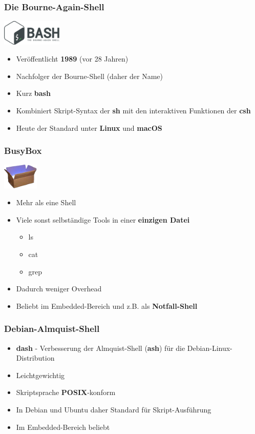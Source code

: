 \begin{frame}
    \frametitle{Die Bourne-Again-Shell}
    \includegraphics[height=1.2cm]{res/bash.png}
    \begin{itemize}
        \item Veröffentlicht \textbf{1989} (vor 28 Jahren)
        \item Nachfolger der Bourne-Shell (daher der Name)
        \item Kurz \textbf{bash}
        \item Kombiniert Skript-Syntax der \textbf{sh} mit den interaktiven Funktionen der \textbf{csh}
        \item Heute der Standard unter \textbf{Linux} und \textbf{macOS}
    \end{itemize}
\end{frame}

\begin{frame}
    \frametitle{BusyBox}
    \includegraphics[height=1.2cm]{res/busybox.png}
    \begin{itemize}
        \item Mehr als eine Shell
        \item Viele sonst selbständige Tools in einer \textbf{einzigen Datei}
        \begin{itemize}
            \item ls
            \item cat
            \item grep
        \end{itemize}
        \item Dadurch weniger Overhead
        \item Beliebt im Embedded-Bereich und z.B. als \textbf{Notfall-Shell}
    \end{itemize}
\end{frame}

\begin{frame}
    \frametitle{Debian-Almquist-Shell}
    \begin{itemize}
        \item \textbf{dash} - Verbesserung der Almquist-Shell (\textbf{ash}) für die Debian-Linux-Distribution
        \item Leichtgewichtig
        \item Skriptsprache \textbf{POSIX}-konform
        \item In Debian und Ubuntu daher Standard für Skript-Ausführung
        \item Im Embedded-Bereich beliebt
    \end{itemize}
\end{frame}

